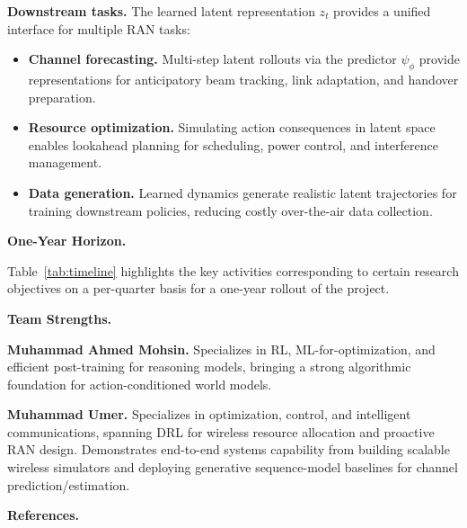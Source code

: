 \documentclass[11pt,a4paper]{article}
\begin{document}
\textbf{\textcolor{stanfordred}{Downstream tasks.}} The learned latent representation $z_t$ provides a unified interface for multiple RAN tasks:
\begin{itemize}
    \item \textbf{Channel forecasting.} Multi-step latent rollouts via the predictor $\psi_\phi$ provide representations for anticipatory beam tracking, link adaptation, and handover preparation.
    \item \textbf{Resource optimization.} Simulating action consequences in latent space enables lookahead planning for scheduling, power control, and interference management.
    \item \textbf{Data generation.} Learned dynamics generate realistic latent trajectories for training downstream policies, reducing costly over-the-air data collection.
\end{itemize}

\vspace{1em}
\textbf{\textcolor{stanfordred}{\large One-Year Horizon.}}

Table~\ref{tab:timeline} highlights the key activities corresponding to certain research objectives on a per-quarter basis for a one-year rollout of the project.

\vspace{1em}
\textbf{\textcolor{stanfordred}{\large Team Strengths.}}

\textbf{Muhammad Ahmed Mohsin.} Specializes in RL, ML-for-optimization, and efficient post-training for reasoning models, bringing a strong algorithmic foundation for action-conditioned world models.

\textbf{Muhammad Umer.} Specializes in optimization, control, and intelligent communications, spanning DRL for wireless resource allocation and proactive RAN design. Demonstrates end-to-end systems capability from building scalable wireless simulators and deploying generative sequence-model baselines for channel prediction/estimation.

\newpage
\textbf{\textcolor{stanfordred}{\large References.}}
\vspace{-2em}

\renewcommand{\refname}{}

\end{document}
